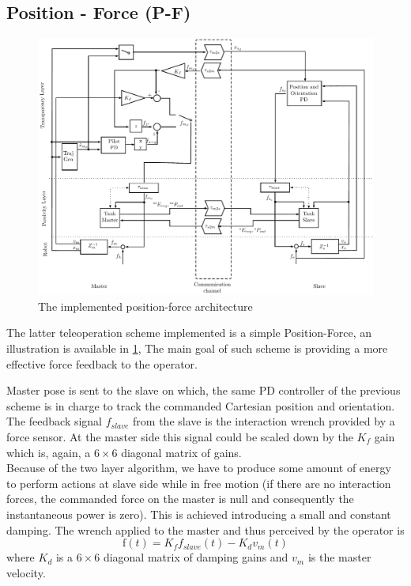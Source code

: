 \subsection{Position - Force (P-F)}\label{sec:position---force-p-f}
\begin{figure}
	\includegraphics[width=\linewidth]{schemas/TwoLayerPFok.pdf}
	\caption[The implemented P-F architecture]{The implemented position-force architecture}
	\label{sch:TwoLayerPF}
\end{figure}

The latter teleoperation scheme implemented is a simple Position-Force, an illustration is available in \figurename{ \ref{sch:TwoLayerPF}}, 
The main goal of such scheme is providing a more effective force feedback to the operator.

Master pose is sent to the slave on which, the same PD controller of the previous scheme is in charge to track the commanded Cartesian position and orientation.
The feedback signal $f_{slave}$ from the slave is the interaction wrench provided by a force sensor.
At the master side this signal could be scaled down by the $K_{f}$ gain which is, again, a $6\times6$ diagonal matrix of gains.\\
Because of the two layer algorithm, we have to produce some amount of energy to perform actions at slave side while in free motion (if there are no interaction forces, the commanded force on the master is null and consequently the instantaneous power is zero).
This is achieved introducing a small and constant damping.
The wrench applied to the master and thus perceived by the operator is
\begin{equation}
		\mathrm{f}(t) = K_{f}f_{slave}(t) - K_{d} v_{m}(t)
\end{equation}
where $K_{d}$ is a $6\times6$ diagonal matrix of damping gains and $v_{m}$ is the master velocity.

